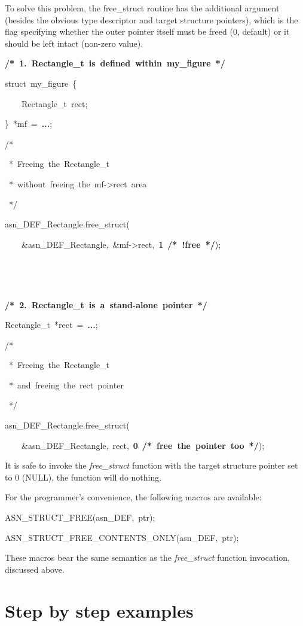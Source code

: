 \documentclass[english,oneside,12pt]{book}
\newenvironment{lyxcode}
{\par\begin{list}{}{
\setlength{\rightmargin}{\leftmargin}
\setlength{\listparindent}{0pt}%
\raggedright
\setlength{\itemsep}{0pt}
\setlength{\parsep}{0pt}
\normalfont\ttfamily}%
 \item[]}
{\end{list}}
\begin{document}
To solve this problem, the free\_struct routine has the additional
argument (besides the obvious type descriptor and target structure
pointers), which is the flag specifying whether the outer pointer
itself must be freed (0, default) or it should be left intact (non-zero
value).
\begin{lyxcode}
\textbf{/{*}~1.~Rectangle\_t~is~defined~within~my\_figure~{*}/}

struct~my\_figure~\{

~~~~Rectangle\_t~rect;

\}~{*}mf~=~\textbf{...};

/{*}

~{*}~Freeing~the~Rectangle\_t

~{*}~without~freeing~the~mf->rect~area

~{*}/

asn\_DEF\_Rectangle.free\_struct(

~~~~\&asn\_DEF\_Rectangle,~\&mf->rect,~\textbf{1}~\textbf{/{*}~!free~{*}/});

~~~~

~~

\textbf{/{*}~2.~Rectangle\_t~is~a~stand-alone~pointer~{*}/}

Rectangle\_t~{*}rect~=~\textbf{...};

/{*}

~{*}~Freeing~the~Rectangle\_t

~{*}~and~freeing~the~rect~pointer

~{*}/

asn\_DEF\_Rectangle.free\_struct(

~~~~\&asn\_DEF\_Rectangle,~rect,~\textbf{0}~\textbf{/{*}~free~the~pointer~too~{*}/});
\end{lyxcode}
It is safe to invoke the \emph{free\_struct} function with the target
structure pointer set to 0 (NULL), the function will do nothing.

For the programmer's convenience, the following macros are available:
\begin{lyxcode}
ASN\_STRUCT\_FREE(asn\_DEF,~ptr);

ASN\_STRUCT\_FREE\_CONTENTS\_ONLY(asn\_DEF,~ptr);
\end{lyxcode}
These macros bear the same semantics as the \emph{free\_struct} function
invocation, discussed above.


\chapter{\label{cha:Step-by-step-examples}Step by step examples}
\end{document}
